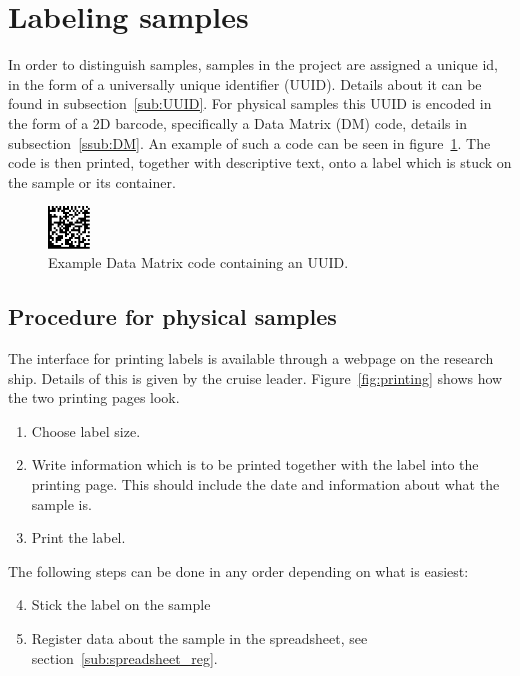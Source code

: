 \documentclass[a4paper,english, 11pt]{article}
\begin{document}
\section{Labeling samples} %
\label{sec:Labeling samples}



In order to distinguish samples, samples in the project are assigned a unique id, in the form of a universally unique identifier (UUID). Details about it can be found in subsection~\ref{sub:UUID}. For physical samples this UUID is encoded in the form of a 2D barcode, specifically a Data Matrix (DM) code, details in subsection~\ref{ssub:DM}. An example of such a code can be seen in figure~\ref{fig:data_matrix}. The code is then printed, together with descriptive text, onto a label which is stuck on the sample or its container.

\begin{figure}[htb]
    \centering
    \includegraphics[width=0.1\textwidth]{Data_matrix.png}
    \caption{\label{fig:data_matrix}
        Example Data Matrix code containing an UUID.
    }

\end{figure}

\subsection{Procedure for physical samples} %
\label{sub:Procedure for physical samples}


The interface for printing labels is available through a webpage on the research ship. Details of this is given by the cruise leader. Figure~\ref{fig:printing} shows how the two printing pages look.

\begin{enumerate}
    \item Choose label size.
    \item Write information which is to be printed together with the label into the printing page. This should include the date and information about what the sample is.
    \item Print the label.  
\end{enumerate}
The following steps can be done in any order depending on what is easiest:
\begin{enumerate}
\setcounter{enumi}{3}
    \item Stick the label on the sample
    \item Register data about the sample in the spreadsheet, see section~\ref{sub:spreadsheet_reg}.
\end{enumerate}
\end{document}
